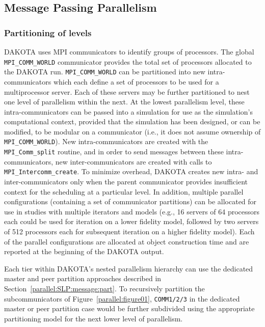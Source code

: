 \subsection{Message Passing Parallelism}\label{parallel:MLP:message}

\subsubsection{Partitioning of levels}\label{parallel:MLP:message:partitioning}

DAKOTA uses MPI communicators to identify groups of processors. The
global \texttt{MPI\_COMM\_WORLD} communicator provides the total set
of processors allocated to the DAKOTA run. \texttt{MPI\_COMM\_WORLD}
can be partitioned into new intra-communicators which each define a
set of processors to be used for a multiprocessor server. Each of
these servers may be further partitioned to nest one level of
parallelism within the next. At the lowest parallelism level, these
intra-communicators can be passed into a simulation for use as the
simulation's computational context, provided that the simulation has
been designed, or can be modified, to be modular on a communicator
(i.e., it does not assume ownership of \texttt{MPI\_COMM\_WORLD}). New
intra-communicators are created with the \texttt{MPI\_Comm\_split}
routine, and in order to send messages between these
intra-communicators, new inter-communicators are created with calls to
\texttt{MPI\_Intercomm\_create}. To minimize overhead, DAKOTA creates
new intra- and inter-communicators only when the parent communicator
provides insufficient context for the scheduling at a particular
level. In addition, multiple parallel configurations (containing a set
of communicator partitions) can be allocated for use in studies with
multiple iterators and models (e.g., 16 servers of 64 processors each
could be used for iteration on a lower fidelity model, followed by two
servers of 512 processors each for subsequent iteration on a higher
fidelity model).  Each of the parallel configurations are allocated
at object construction time and are reported at the beginning of the
DAKOTA output.

Each tier within DAKOTA's nested parallelism hierarchy can use the
dedicated master and peer partition approaches described in
Section~\ref{parallel:SLP:message:part}. To recursively partition the
subcommunicators of Figure~\ref{parallel:figure01},
\texttt{COMM1/2/3} in the dedicated master or peer partition case
would be further subdivided using the appropriate partitioning model
for the next lower level of parallelism.


